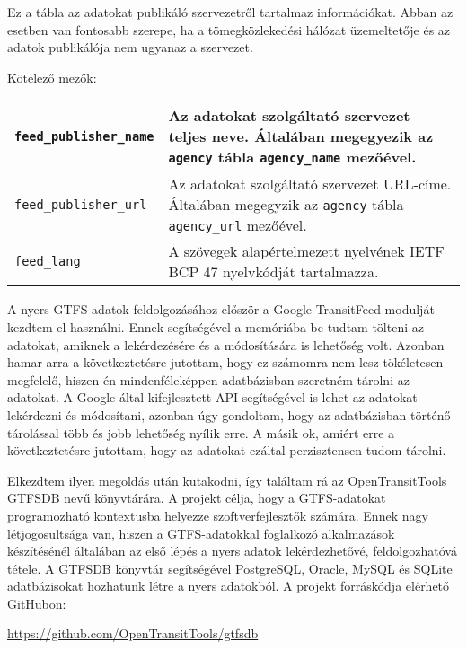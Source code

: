 
Ez a tábla az adatokat publikáló szervezetről tartalmaz információkat. Abban az esetben van fontosabb szerepe, ha a tömegközlekedési hálózat üzemeltetője és az adatok publikálója nem ugyanaz a szervezet.

\medskip

\noindent Kötelező mezők:

\bigskip

\begin{tabular}{|p{4.5cm}|p{8.5cm}|}
\hline
\texttt{feed\_publisher\_name} & Az adatokat szolgáltató szervezet teljes neve. Általában megegyezik az \texttt{agency} tábla \texttt{agency\_name} mezőével. \\
\hline
\texttt{feed\_publisher\_url} & Az adatokat szolgáltató szervezet URL-címe. Általában megegyzik az \texttt{agency} tábla \texttt{agency\_url} mezőével. \\
\hline
\texttt{feed\_lang} & A szövegek alapértelmezett nyelvének IETF BCP 47 nyelvkódját tartalmazza. \\
\hline
\end{tabular}


A nyers GTFS-adatok feldolgozásához először a Google TransitFeed modulját kezdtem el használni. Ennek segítségével a memóriába be tudtam tölteni az adatokat, amiknek a lekérdezésére és a módosítására is lehetőség volt. Azonban hamar arra a következtetésre jutottam, hogy ez számomra nem lesz tökéletesen megfelelő, hiszen én mindenféleképpen adatbázisban szeretném tárolni az adatokat. A Google által kifejlesztett API segítségével is lehet az adatokat lekérdezni és módosítani, azonban úgy gondoltam, hogy az adatbázisban történő tárolással több és jobb lehetőség nyílik erre. A másik ok, amiért erre a következtetésre jutottam, hogy az adatokat ezáltal perzisztensen tudom tárolni.

Elkezdtem ilyen megoldás után kutakodni, így találtam rá az OpenTransitTools GTFSDB nevű könyvtárára. A projekt célja, hogy a GTFS-adatokat programozható kontextusba helyezze szoftverfejlesztők számára. Ennek nagy létjogosultsága van, hiszen a GTFS-adatokkal foglalkozó alkalmazások készítésénél általában az első lépés a nyers adatok lekérdezhetővé, feldolgozhatóvá tétele. A GTFSDB könyvtár segítségével PostgreSQL, Oracle, MySQL és SQLite adatbázisokat hozhatunk létre a nyers adatokból. A projekt forráskódja elérhető GitHubon:

\begin{center}
\url{https://github.com/OpenTransitTools/gtfsdb}
\end{center}

